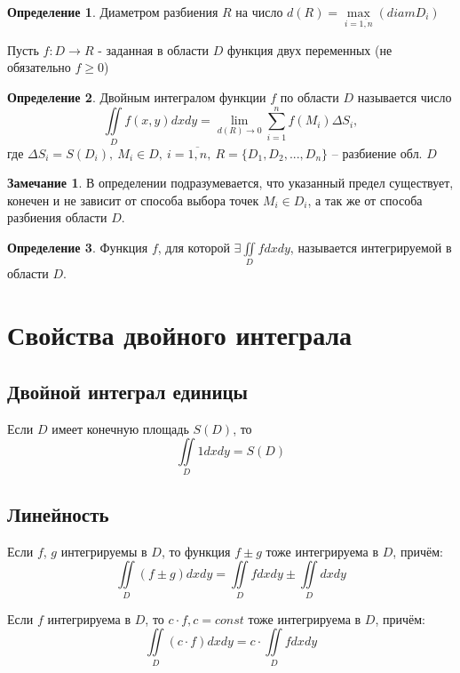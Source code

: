 \documentclass[a4paper, 14pt]{report}
\theoremstyle{definition}
\newtheorem*{definition}{Определение}
\newtheorem*{note}{Замечание}
\begin{document}
			\begin{definition}
				Диаметром разбиения $R$ на число $d(R)=\underset{i=\overline{1,n}}{\max}(diamD_i)$
			\end{definition}
		
			Пусть $f:D\rightarrow R$ - заданная в области $D$ функция двух переменных (не обязательно $f\ge 0$)
			\begin{definition}
				Двойным интегралом функции $f$ по области $D$ называется число
				\begin{equation}
					\iint\limits_{D}f(x,y)dxdy=\lim_{d(R)\rightarrow0}\sum_{i=1}^{n}f(M_i)\Delta S_i,
				\end{equation}
				где $\Delta S_i=S(D_i),~
				M_i\in D,~
				i=\overline{1,n},~
				R=\{D_1,D_2,...,D_n\}$ -- разбиение обл. $D$
			\end{definition}
		
			\begin{note}
				В определении подразумевается, что указанный предел существует, конечен и не зависит от способа выбора точек $M_i\in D_i$, а так же от способа разбиения области $D$.
			\end{note}
		
			\begin{definition}
				Функция $f$, для которой $\exists\iint\limits_{D}fdxdy$, называется интегрируемой в области $D$.
			\end{definition}
	\section{Свойства двойного интеграла}
		\subsection{Двойной интеграл единицы}		
			Если $D$ имеет конечную площадь $S(D)$, то
			\begin{equation}
				\iint\limits_{D}1dxdy=S(D)
			\end{equation}
		\subsection{Линейность}
			Если $f$, $g$ интегрируемы в $D$, то функция $f\pm g$ тоже интегрируема в $D$, причём:
			\begin{equation}
				\iint\limits_{D}(f\pm g)dxdy=\iint\limits_{D}fdxdy\pm\iint\limits_{D}dxdy
			\end{equation}
			
			Если $f$ интегрируема в $D$, то $c\cdot f, c = const$ тоже интегрируема в $D$, причём:
			\begin{equation}
				\iint\limits_{D}(c\cdot f)dxdy=c\cdot\iint\limits_{D}fdxdy
			\end{equation}
\end{document}
